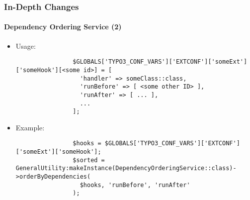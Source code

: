 \begin{frame}[fragile]
	\frametitle{In-Depth Changes}
	\framesubtitle{Dependency Ordering Service (2)}

	\lstset{basicstyle=\tiny\ttfamily}

	\begin{itemize}

		\item Usage:

			\begin{lstlisting}
				$GLOBALS['TYPO3_CONF_VARS']['EXTCONF']['someExt']['someHook'][<some id>] = [
				  'handler' => someClass::class,
				  'runBefore' => [ <some other ID> ],
				  'runAfter' => [ ... ],
				  ...
				];
			\end{lstlisting}

		\item Example:

			\begin{lstlisting}
				$hooks = $GLOBALS['TYPO3_CONF_VARS']['EXTCONF']['someExt']['someHook'];
				$sorted = GeneralUtility:makeInstance(DependencyOrderingService::class)->orderByDependencies(
				  $hooks, 'runBefore', 'runAfter'
				);
			\end{lstlisting}

	\end{itemize}

\end{frame}


